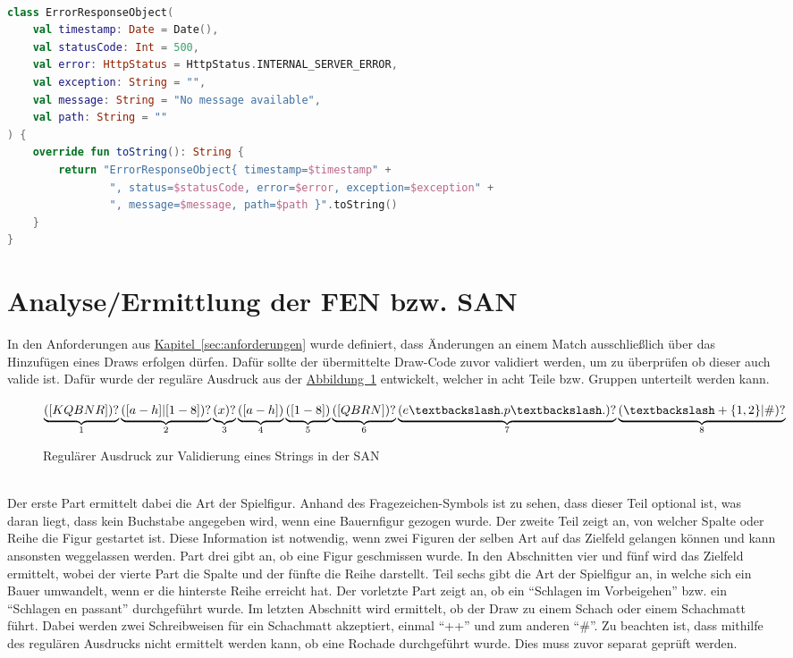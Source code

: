 \\
\begin{lstlisting}[style=lstStyleFramed, language=Kotlin, caption={Das Fehlerobjekt \code{ErrorResponseObject}}, label=lst:errorResponseObject, float]
class ErrorResponseObject(
	val timestamp: Date = Date(),
	val statusCode: Int = 500,
	val error: HttpStatus = HttpStatus.INTERNAL_SERVER_ERROR,
	val exception: String = "",
	val message: String = "No message available",
	val path: String = ""
) {
	override fun toString(): String {
		return "ErrorResponseObject{ timestamp=$timestamp" +
				", status=$statusCode, error=$error, exception=$exception" +
				", message=$message, path=$path }".toString()
	}
}
\end{lstlisting}

\section{Analyse/Ermittlung der FEN bzw. SAN}\label{sec:analyseFENSAN}
In den Anforderungen aus \hyperref[sec:anforderungen]{Kapitel~\ref{sec:anforderungen}} wurde definiert, dass Änderungen an einem Match ausschließlich über das Hinzufügen eines Draws erfolgen dürfen. Dafür sollte der übermittelte Draw-Code zuvor validiert werden, um zu überprüfen ob dieser auch valide ist. Dafür wurde der reguläre Ausdruck aus der \hyperref[fig:regexSAN]{Abbildung~\ref{fig:regexSAN}} entwickelt, welcher in acht Teile bzw. Gruppen unterteilt werden kann.\\
\begin{figure}
	$\underbrace{([KQBNR])?}_{1}\underbrace{([a-h]|[1-8])?}_{2}\underbrace{(x)?}_{3}\underbrace{([a-h])}_{4}\underbrace{([1-8])}_{5}\underbrace{([QBRN])?}_{6}\underbrace{(e\textbackslash.p\textbackslash.)?}_{7}\underbrace{(\textbackslash+\{1,2\}|\#)?}_{8}$
\caption{Regulärer Ausdruck zur Validierung eines Strings in der SAN}
\label{fig:regexSAN}
\end{figure}
\\
Der erste Part ermittelt dabei die Art der Spielfigur. Anhand des Fragezeichen-Symbols ist zu sehen, dass dieser Teil optional ist, was daran liegt, dass kein Buchstabe angegeben wird, wenn eine Bauernfigur gezogen wurde. Der zweite Teil zeigt an, von welcher Spalte oder Reihe die Figur gestartet ist. Diese Information ist notwendig, wenn zwei Figuren der selben Art auf das Zielfeld gelangen können und kann ansonsten weggelassen werden. Part drei gibt an, ob eine Figur geschmissen wurde. In den Abschnitten vier und fünf wird das Zielfeld ermittelt, wobei der vierte Part die Spalte und der fünfte die Reihe darstellt. Teil sechs gibt die Art der Spielfigur an, in welche sich ein Bauer umwandelt, wenn er die hinterste Reihe erreicht hat. Der vorletzte Part zeigt an, ob ein \enquote{Schlagen im Vorbeigehen} bzw. ein \enquote{Schlagen en passant} durchgeführt wurde. Im letzten Abschnitt wird ermittelt, ob der Draw zu einem Schach oder einem Schachmatt führt. Dabei werden zwei Schreibweisen für ein Schachmatt akzeptiert, einmal \enquote{++} und zum anderen \enquote{\#}. Zu beachten ist, dass mithilfe des regulären Ausdrucks nicht ermittelt werden kann, ob eine Rochade durchgeführt wurde. Dies muss zuvor separat geprüft werden.\\
